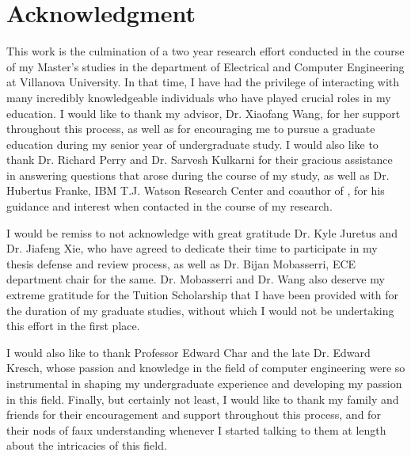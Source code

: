 
\pagestyle{empty}
\chapter{Acknowledgment}
This work is the culmination of a two year research effort conducted in the course of my Master's studies in the department of Electrical and Computer Engineering at Villanova University. In that time, I have had the privilege of interacting with many incredibly knowledgeable individuals who have played crucial roles in my education. I would like to thank my advisor, Dr. Xiaofang Wang, for her support throughout this process, as well as for encouraging me to pursue a graduate education during my senior year of undergraduate study. I would also like to thank Dr. Richard Perry and Dr. Sarvesh Kulkarni for their gracious assistance in answering questions that arose during the course of my study, as well as Dr. Hubertus Franke, IBM T.J. Watson Research Center and coauthor of \cite{chen_enabling_2014}, for his guidance and interest when contacted in the course of my research.

I would be remiss to not acknowledge with great gratitude Dr. Kyle Juretus and Dr. Jiafeng Xie, who have agreed to dedicate their time to participate in my thesis defense and review process, as well as Dr. Bijan Mobasserri, ECE department chair for the same. Dr. Mobasserri and Dr. Wang also deserve my extreme gratitude for the Tuition Scholarship that I have been provided with for the duration of my graduate studies, without which I would not be undertaking this effort in the first place.

I would also like to thank Professor Edward Char and the late Dr. Edward Kresch, whose passion and knowledge in the field of computer engineering were so instrumental in shaping my undergraduate experience and developing my passion in this field. Finally, but certainly not least, I would like to thank my family and friends for their encouragement and support throughout this process, and for their nods of faux understanding whenever I started talking to them at length about the intricacies of this field.
